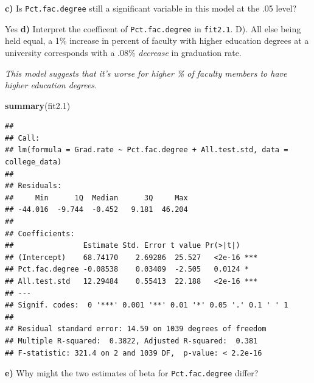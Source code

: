 \documentclass[]{article}
\newenvironment{Shaded}{\begin{snugshade}}{\end{snugshade}}
\newcommand{\KeywordTok}[1]{\textcolor[rgb]{0.13,0.29,0.53}{\textbf{#1}}}
\newcommand{\DecValTok}[1]{\textcolor[rgb]{0.00,0.00,0.81}{#1}}
\newcommand{\StringTok}[1]{\textcolor[rgb]{0.31,0.60,0.02}{#1}}
\newcommand{\CommentTok}[1]{\textcolor[rgb]{0.56,0.35,0.01}{\textit{#1}}}
\newcommand{\OperatorTok}[1]{\textcolor[rgb]{0.81,0.36,0.00}{\textbf{#1}}}
\newcommand{\NormalTok}[1]{#1}
\begin{document}
\textbf{c)} Is \texttt{Pct.fac.degree} still a significant variable in
this model at the .05 level?

Yes \textbf{d)} Interpret the coefficent of \texttt{Pct.fac.degree} in
\texttt{fit2.1}. D). All else being held equal, a 1\% increase in
percent of faculty with higher education degrees at a university
corresponds with a .08\% \emph{decrease} in graduation rate.

\emph{This model suggests that it's worse for higher \% of faculty
members to have higher education degrees. }

\begin{Shaded}
\begin{Highlighting}[]
\KeywordTok{summary}\NormalTok{(fit2.}\DecValTok{1}\NormalTok{)}
\end{Highlighting}
\end{Shaded}

\begin{verbatim}
## 
## Call:
## lm(formula = Grad.rate ~ Pct.fac.degree + All.test.std, data = college_data)
## 
## Residuals:
##     Min      1Q  Median      3Q     Max 
## -44.016  -9.744  -0.452   9.181  46.204 
## 
## Coefficients:
##                Estimate Std. Error t value Pr(>|t|)    
## (Intercept)    68.74170    2.69286  25.527   <2e-16 ***
## Pct.fac.degree -0.08538    0.03409  -2.505   0.0124 *  
## All.test.std   12.29484    0.55413  22.188   <2e-16 ***
## ---
## Signif. codes:  0 '***' 0.001 '**' 0.01 '*' 0.05 '.' 0.1 ' ' 1
## 
## Residual standard error: 14.59 on 1039 degrees of freedom
## Multiple R-squared:  0.3822, Adjusted R-squared:  0.381 
## F-statistic: 321.4 on 2 and 1039 DF,  p-value: < 2.2e-16
\end{verbatim}

\textbf{e)} Why might the two estimates of beta for
\texttt{Pct.fac.degree} differ?

\begin{Shaded}
\end{Shaded}
\end{document}
